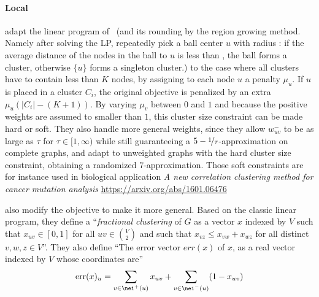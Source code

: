 \paragraph{Local \pcc{}}

\Textcite{Puleo2014} adapt the linear program of~\autocite{Charikar2003} (and its rounding by the
region growing method. Namely after solving the LP, repeatedly pick a ball center $u$ \uar{} with
radius \shalf{}: if the average distance of the nodes in the ball to $u$ is less than
, the ball forms a cluster, otherwise $\{u\}$ forms a singleton cluster.) to the case
where all clusters have to contain less than $K$ nodes, by assigning to each node $u$ a penalty
$\mu_u$. If $u$ is placed in a cluster $C_i$, the original \mind{} objective is penalized by an
extra $\mu_u\left(|C_i| - (K+1)\right)$. By varying $\mu_v$ between $0$ and $1$ and because the
positive weights are assumed to smaller than $1$, this cluster size constraint can be made hard or
soft. They also handle more general weights, since they allow $w^-_{uv}$ to be as large as $\tau$
for $\tau\in [1,\infty)$ while still guaranteeing a $5-\nicefrac{1}{\tau}$-approximation on complete
graphs, and adapt \ccpivot{} to unweighted graphs with the hard cluster size constraint, obtaining a
randomized $7$-approximation.
Those soft constraints are for instance used in biological application 
\emph{A new correlation clustering method for cancer mutation analysis}
\url{https://arxiv.org/abs/1601.06476}
\autocite{Hou2016}

\Textcite{pmlr-v48-puleo16} also modify the \mind{} objective to make it more general. Based on the
classic \pcc{} linear program, they define a \enquote{\emph{fractional clustering} of $G$ as a
vector $x$ indexed by $V$ such that $x_{uv} \in [0, 1]$ for all $uv \in \binom{V}{2}$ and such that
$x_{vz} \leq x_{vw} + x_{wz}$ for all distinct $v, w, z \in V$}. They also define \enquote{The
error vector $err(x)$ of $x$, as a real vector indexed by $V$ whose coordinates are}
\begin{equation*}
  \mathrm{err}(x)_u = \sum_{v\in\nei^+(u)} x_{uv} + \sum_{v\in\nei^-(u)} (1-x_{uv})
\end{equation*}

